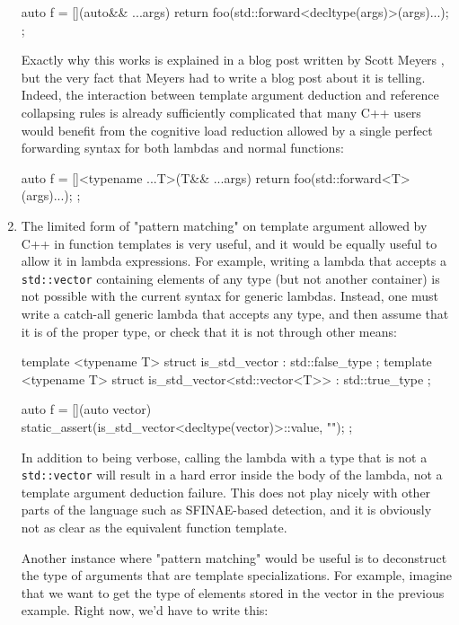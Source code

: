 \documentclass[11pt]{article}
\newcommand{\cc}[1]{\texttt{#1}}
\begin{document}
\begin{enumerate}
\begin{cpp}
auto f = [](auto&& ...args) {
  return foo(std::forward<decltype(args)>(args)...);
};
\end{cpp}

Exactly why this works is explained in a blog post written by Scott Meyers
\cite{Meyers}, but the very fact that Meyers had to write a blog post about
it is telling. Indeed, the interaction between template argument deduction
and reference collapsing rules is already sufficiently complicated that many
C++ users would benefit from the cognitive load reduction allowed by a single
perfect forwarding syntax for both lambdas and normal functions:

\begin{cpp}
auto f = []<typename ...T>(T&& ...args) {
  return foo(std::forward<T>(args)...);
};
\end{cpp}


\item
The limited form of "pattern matching" on template argument allowed by C++
in function templates is very useful, and it would be equally useful to allow
it in lambda expressions. For example, writing a lambda that accepts a
\cc{std::vector} containing elements of any type (but not another container)
is not possible with the current syntax for generic lambdas. Instead, one
must write a catch-all generic lambda that accepts any type, and then assume
that it is of the proper type, or check that it is not through other means:

\begin{cpp}
template <typename T> struct is_std_vector                 : std::false_type { };
template <typename T> struct is_std_vector<std::vector<T>> : std::true_type { };

auto f = [](auto vector) {
  static_assert(is_std_vector<decltype(vector)>::value, "");
};
\end{cpp}

In addition to being verbose, calling the lambda with a type that is not a
\cc{std::vector} will result in a hard error inside the body of the lambda, not
a template argument deduction failure. This does not play nicely with other
parts of the language such as SFINAE-based detection, and it is obviously
not as clear as the equivalent function template.

Another instance where "pattern matching" would be useful is to deconstruct
the type of arguments that are template specializations. For example, imagine
that we want to get the type of elements stored in the vector in the previous
example. Right now, we'd have to write this:


\end{enumerate}
\end{document}
